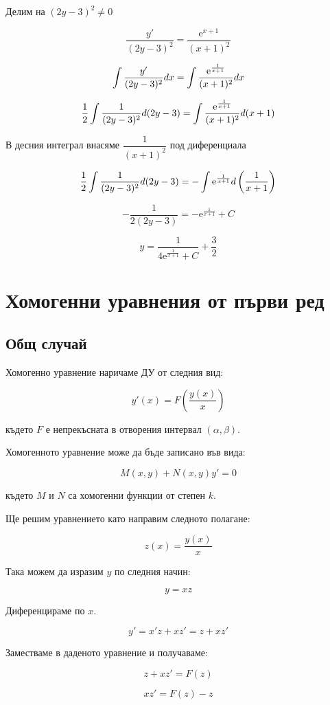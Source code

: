 \documentclass{scrartcl}
\begin{document}
Делим на $(2y-3)^2 \ne 0$

$$\dfrac{y'}{(2y-3)^2} = \dfrac{\mathrm{e}^{x+1}}{(x+1)^2}$$

$$\displaystyle\int\dfrac{y'}{(2y-3)^2}\space dx = \int\dfrac{\mathrm{e}^{\frac{1}{x+1}}}{(x+1)^2}\space dx$$

$$\displaystyle\dfrac{1}{2}\int\dfrac{1}{(2y-3)^2}\space d(2y-3) = \int\dfrac{\mathrm{e}^{\frac{1}{x+1}}}{(x+1)^2}\space d(x+1)$$

В десния интеграл внасяме $\dfrac{1}{(x+1)^2}$ под диференциала

$$\displaystyle\dfrac{1}{2}\int\dfrac{1}{(2y-3)^2}\space d(2y-3) = -\int\mathrm{e}^{\frac{1}{x+1}}\space d\left(\dfrac{1}{x+1}\right)$$

$$-\dfrac{1}{2(2y-3)} = -\mathrm{e}^{\frac{1}{x+1}}+C$$

$$y=\dfrac{1}{4\mathrm{e}^{\frac{1}{x+1}}+C}+\dfrac{3}{2}$$

\section{Хомогенни уравнения от първи ред}

\subsection{Общ случай}

Хомогенно уравнение наричаме ДУ от следния вид:

$$y'(x) = F\left(\dfrac{y(x)}{x}\right)$$

където $F$ е непрекъсната в отворения интервал $(\alpha, \beta)$.

Хомогенното уравнение може да бъде записано във вида:

$$M(x, y) + N(x, y)y' = 0$$

където $M$ и $N$ са хомогенни функции от степен $k$.

Ще решим уравнението като направим следното полагане:

$$z(x) = \dfrac{y(x)}{x}$$

Така можем да изразим $y$ по следния начин:

$$y = xz$$

Диференцираме по $x$.

$$y' = x'z + xz' = z + xz'$$

Заместваме в даденото уравнение и получаваме:

$$z + xz' = F(z)$$

$$xz' = F(z) - z$$
\end{document}
